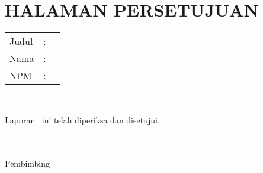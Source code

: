 %
%
%

\chapter*{\normalsize HALAMAN PERSETUJUAN}

\vspace*{0.2cm}
\noindent

\noindent
\begin{tabular}{l l p{11cm}}
	Judul&: & \judul \\
	Nama&: & \penulis \\
	NPM&: & \npm \\
\end{tabular} \\

\vspace*{1.2cm}

\noindent Laporan \type~ini telah diperiksa dan disetujui.\\[0.3cm]
\begin{center}
\tanggalPengesahan \\[2cm]


\underline{\pembimbinga}\\[0.1cm]
Pembimbing \type
\end{center}

\newpage 